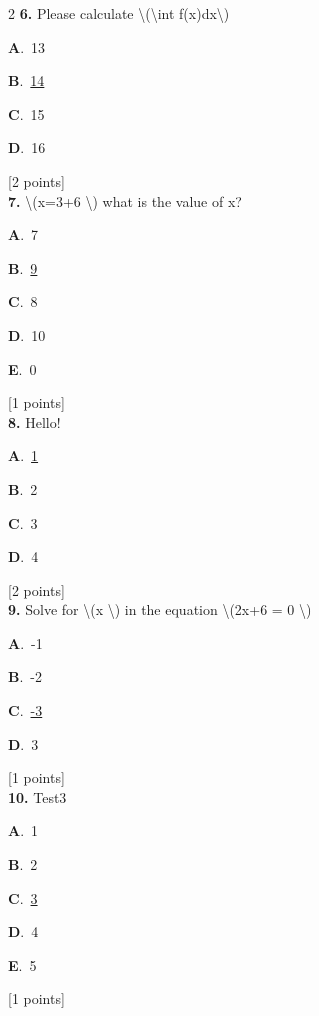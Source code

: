 \documentclass[12pt]{article}
\newcommand{\choice}[3]{%
  \noindent\textbf{#1}.~#2\hfill#3\par\vspace{0.25em}
}
\begin{document}
\begin{multicols}{2}
\noindent \textbf{\textenglish{6.}} {\textenglish{Please calculate \textbackslash{}(\textbackslash{}int f(x)dx\textbackslash{})}}

\noindent\choice{A}{{\textenglish{13}}}{}
\noindent\choice{B}{\underline{{\textenglish{14}}}}{}
\noindent\choice{C}{{\textenglish{15}}}{}
\noindent\choice{D}{{\textenglish{16}}}{}
\hfill {\textenglish{[2 points]}}\\[0.5em]

\noindent \textbf{\textenglish{7.}} {\textenglish{\textbackslash{}(x=3+6 \textbackslash{}) what is the value of x?}}

\noindent\choice{A}{{\textenglish{7}}}{}
\noindent\choice{B}{\underline{{\textenglish{9}}}}{}
\noindent\choice{C}{{\textenglish{8}}}{}
\noindent\choice{D}{{\textenglish{10}}}{}
\noindent\choice{E}{{\textenglish{0}}}{}
\hfill {\textenglish{[1 points]}}\\[0.5em]

\noindent \textbf{\textenglish{8.}} {\textenglish{Hello!}}

\noindent\choice{A}{\underline{{\textenglish{1}}}}{}
\noindent\choice{B}{{\textenglish{2}}}{}
\noindent\choice{C}{{\textenglish{3}}}{}
\noindent\choice{D}{{\textenglish{4}}}{}
\hfill {\textenglish{[2 points]}}\\[0.5em]

\noindent \textbf{\textenglish{9.}} {\textenglish{Solve for \textbackslash{}(x \textbackslash{}) in the equation \textbackslash{}(2x+6 = 0 \textbackslash{})}}

\noindent\choice{A}{{\textenglish{-1}}}{}
\noindent\choice{B}{{\textenglish{-2}}}{}
\noindent\choice{C}{\underline{{\textenglish{-3}}}}{}
\noindent\choice{D}{{\textenglish{3}}}{}
\hfill {\textenglish{[1 points]}}\\[0.5em]

\noindent \textbf{\textenglish{10.}} {\textenglish{Test3}}

\noindent\choice{A}{{\textenglish{1}}}{}
\noindent\choice{B}{{\textenglish{2}}}{}
\noindent\choice{C}{\underline{{\textenglish{3}}}}{}
\noindent\choice{D}{{\textenglish{4}}}{}
\noindent\choice{E}{{\textenglish{5}}}{}
\hfill {\textenglish{[1 points]}}\\[0.5em]


\end{multicols}
\end{document}
